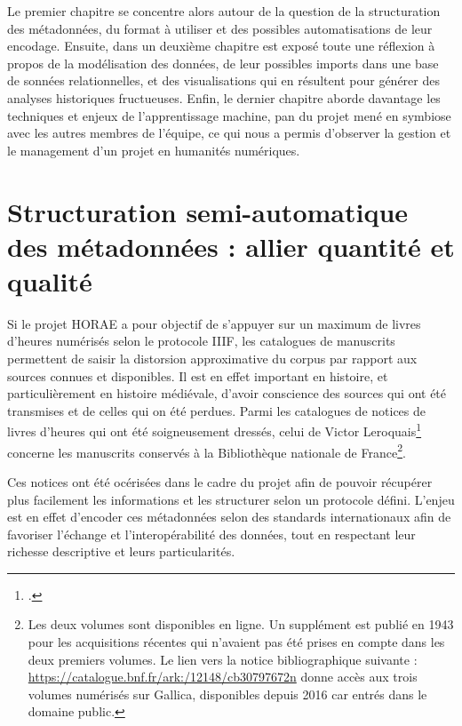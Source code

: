 \documentclass[a4paper,12pt,twoside]{book}
\begin{document}
Le premier chapitre se concentre alors autour de la question de la structuration des métadonnées, du format à utiliser et des possibles automatisations de leur encodage. Ensuite, dans un deuxième chapitre est exposé toute une réflexion à propos de la modélisation des données, de leur possibles imports dans une base de sonnées relationnelles, et des visualisations qui en résultent pour générer des analyses historiques fructueuses. Enfin, le dernier chapitre aborde davantage les techniques et enjeux de l'apprentissage machine, pan du projet mené en symbiose avec les autres membres de l'équipe, ce qui nous a permis d'observer la gestion et le management d'un projet en humanités numériques. 

	
	\thispagestyle{empty}
	\cleardoublepage
	
	\mainmatter
	
	\chapter{\label{metadonnees}Structuration semi-automatique des métadonnées : allier quantité et qualité}
		
	Si le projet HORAE a pour objectif de s'appuyer sur un maximum de livres d'heures numérisés selon le protocole IIIF, les catalogues de manuscrits permettent de saisir la distorsion approximative du corpus par rapport aux sources connues et disponibles. Il est en effet important en histoire, et particulièrement en histoire médiévale, d'avoir conscience des sources qui ont été transmises et de celles qui on été perdues. Parmi les catalogues de notices de livres d'heures qui ont été soigneusement dressés, celui de Victor Leroquais\footcite{Leroquais_notices} concerne les manuscrits conservés à la Bibliothèque nationale de France\footnote{ Les deux volumes sont disponibles en ligne. Un supplément est publié en 1943 pour les acquisitions récentes qui n'avaient pas été prises en compte dans les deux premiers volumes. Le lien vers la notice bibliographique suivante : \url{https://catalogue.bnf.fr/ark:/12148/cb30797672n} donne accès aux trois volumes numérisés sur Gallica, disponibles depuis 2016 car entrés dans le domaine public.}. 
	
	Ces notices ont été océrisées dans le cadre du projet afin de pouvoir récupérer plus facilement les informations et les structurer selon un protocole défini. L'enjeu est en effet d'encoder ces métadonnées selon des standards internationaux afin de favoriser l'échange et l'interopérabilité des données, tout en respectant leur richesse descriptive et leurs particularités. 
	
\end{document}
